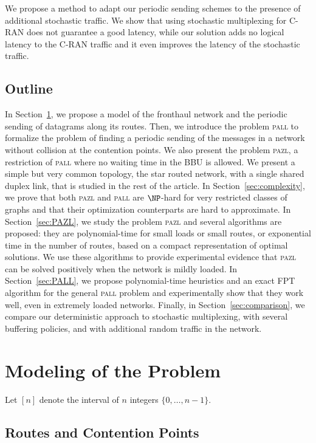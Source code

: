 \documentclass[a4paper,10pt]{journal}
\newcommand\pazl{\textsc{pazl}\xspace}
\newcommand\pall{\textsc{pall}\xspace}
\begin{document}
We propose a method to adapt our periodic sending schemes to the presence of additional stochastic traffic. We show that using stochastic multiplexing for C-RAN does not 
guarantee a good latency, while our solution adds no logical latency to the C-RAN traffic and it even improves the latency of the stochastic traffic. 

\subsection*{Outline}
 In Section~\ref{sec:def}, we propose a model of the fronthaul network and the periodic sending of datagrams along its routes. Then, we introduce the problem \pall to formalize the problem of finding a periodic sending of the messages in a network without collision at the contention points. We also present the problem \pazl, a restriction of \pall where no waiting time in the BBU is allowed. We present a simple but very common topology, the star routed network, with a single shared duplex link, that is studied in the rest of the article.  In Section~\ref{sec:complexity}, we prove that both \pazl and \pall are $\NP$-hard for very restricted classes of graphs and that their optimization counterparts are hard to approximate. 
 In Section~\ref{sec:PAZL}, we study the problem \pazl and several algorithms are proposed: they are polynomial-time for small loads or small routes, or exponential time in the number of routes, based on a compact representation of optimal solutions. We use these algorithms to provide experimental evidence that \pazl can be solved positively when the network is mildly loaded. In Section~\ref{sec:PALL}, we propose polynomial-time heuristics and an exact FPT algorithm for the general \pall problem and experimentally show that they work well, even in extremely loaded networks. 
Finally, in Section~\ref{sec:comparison}, we compare our deterministic approach to stochastic multiplexing, with several buffering policies, and with additional random traffic in the network.

\section{Modeling of the Problem}\label{sec:def}

Let $[n]$ denote the interval of $n$ integers $\{0,\dots,n-1\}$.


	\subsection{Routes and Contention Points}
\end{document}
